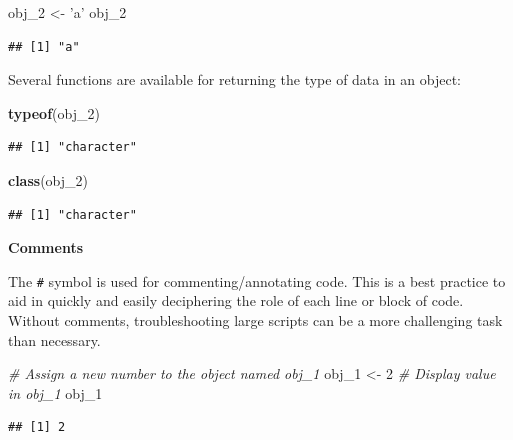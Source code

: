 \documentclass[]{book}
\newenvironment{Shaded}{\begin{snugshade}}{\end{snugshade}}
\newcommand{\CommentTok}[1]{\textcolor[rgb]{0.56,0.35,0.01}{\textit{#1}}}
\newcommand{\DecValTok}[1]{\textcolor[rgb]{0.00,0.00,0.81}{#1}}
\newcommand{\KeywordTok}[1]{\textcolor[rgb]{0.13,0.29,0.53}{\textbf{#1}}}
\newcommand{\NormalTok}[1]{#1}
\newcommand{\StringTok}[1]{\textcolor[rgb]{0.31,0.60,0.02}{#1}}
\begin{document}
\begin{Shaded}
\begin{Highlighting}[]
\NormalTok{obj_}\DecValTok{2}\NormalTok{ <-}\StringTok{ 'a'}
\NormalTok{obj_}\DecValTok{2}
\end{Highlighting}
\end{Shaded}

\begin{verbatim}
## [1] "a"
\end{verbatim}

Several functions are available for returning the type of data in an object:

\begin{Shaded}
\begin{Highlighting}[]
\KeywordTok{typeof}\NormalTok{(obj_}\DecValTok{2}\NormalTok{)}
\end{Highlighting}
\end{Shaded}

\begin{verbatim}
## [1] "character"
\end{verbatim}

\begin{Shaded}
\begin{Highlighting}[]
\KeywordTok{class}\NormalTok{(obj_}\DecValTok{2}\NormalTok{)}
\end{Highlighting}
\end{Shaded}

\begin{verbatim}
## [1] "character"
\end{verbatim}

\textbf{Comments}

The \texttt{\#} symbol is used for commenting/annotating code. This is a best practice to aid in quickly and easily deciphering the role of each line or block of code. Without comments, troubleshooting large scripts can be a more challenging task than necessary.

\begin{Shaded}
\begin{Highlighting}[]
\CommentTok{# Assign a new number to the object named obj_1}
\NormalTok{obj_}\DecValTok{1}\NormalTok{ <-}\StringTok{ }\DecValTok{2}
\CommentTok{# Display value in obj_1}
\NormalTok{obj_}\DecValTok{1}
\end{Highlighting}
\end{Shaded}

\begin{verbatim}
## [1] 2
\end{verbatim}
\end{document}
